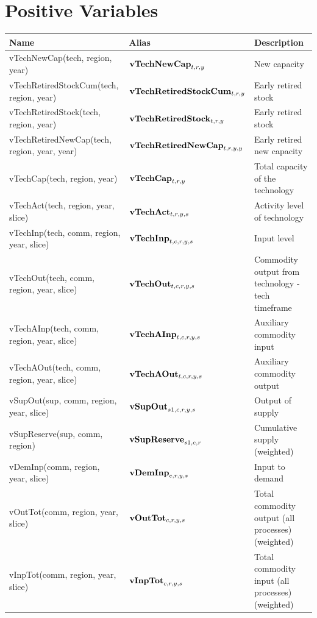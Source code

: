 \documentclass{article}
\begin{document}
\section*{Positive Variables}
\begin{longtable}{|p{10cm}|p{5cm}|p{9cm}|}
\hline
\bf{Name} & \bf{Alias}   & \bf{Description} \\ 
 \hline
vTechNewCap(tech, region, year) & ${\bf vTechNewCap}_{t,r,y}$ & New capacity \\ 
 \hline
vTechRetiredStockCum(tech, region, year) & ${\bf vTechRetiredStockCum}_{t,r,y}$ & Early retired stock \\ 
 \hline
vTechRetiredStock(tech, region, year) & ${\bf vTechRetiredStock}_{t,r,y}$ & Early retired stock \\ 
 \hline
vTechRetiredNewCap(tech, region, year, year) & ${\bf vTechRetiredNewCap}_{t,r,y,y}$ & Early retired new capacity \\ 
 \hline
vTechCap(tech, region, year) & ${\bf vTechCap}_{t,r,y}$ & Total capacity of the technology \\ 
 \hline
vTechAct(tech, region, year, slice) & ${\bf vTechAct}_{t,r,y,s}$ & Activity level of technology \\ 
 \hline
vTechInp(tech, comm, region, year, slice) & ${\bf vTechInp}_{t,c,r,y,s}$ & Input level \\ 
 \hline
vTechOut(tech, comm, region, year, slice) & ${\bf vTechOut}_{t,c,r,y,s}$ & Commodity output from technology - tech timeframe \\ 
 \hline
vTechAInp(tech, comm, region, year, slice) & ${\bf vTechAInp}_{t,c,r,y,s}$ & Auxiliary commodity input \\ 
 \hline
vTechAOut(tech, comm, region, year, slice) & ${\bf vTechAOut}_{t,c,r,y,s}$ & Auxiliary commodity output \\ 
 \hline
vSupOut(sup, comm, region, year, slice) & ${\bf vSupOut}_{s1,c,r,y,s}$ & Output of supply \\ 
 \hline
vSupReserve(sup, comm, region) & ${\bf vSupReserve}_{s1,c,r}$ & Cumulative supply (weighted) \\ 
 \hline
vDemInp(comm, region, year, slice) & ${\bf vDemInp}_{c,r,y,s}$ & Input to demand \\ 
 \hline
vOutTot(comm, region, year, slice) & ${\bf vOutTot}_{c,r,y,s}$ & Total commodity output (all processes) (weighted) \\ 
 \hline
vInpTot(comm, region, year, slice) & ${\bf vInpTot}_{c,r,y,s}$ & Total commodity input (all processes) (weighted) \\ 

\end{longtable}
\end{document}
